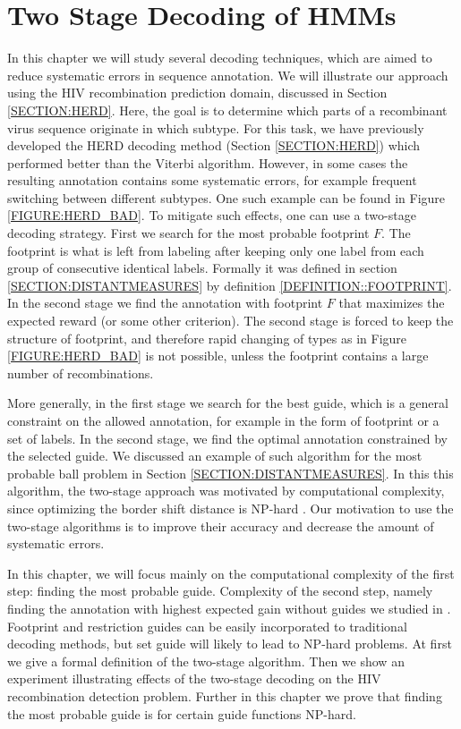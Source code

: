 \chapter{Two Stage Decoding of HMMs}\label{CHAPTER:TWOSTAGE}

In this chapter we will study several decoding techniques, which are aimed to
reduce systematic errors in sequence annotation.  We will illustrate our
approach using the HIV recombination prediction domain, discussed in Section
\ref{SECTION:HERD}. Here, the goal is to determine which parts of a recombinant
virus sequence originate in which subtype.  For this task, we have previously
developed the HERD decoding method \cite{Nanasi2010, Nanasi2010mgr} (Section
\ref{SECTION:HERD}) which performed better than the Viterbi algorithm. However,
in some cases the resulting annotation contains some systematic errors, for
example frequent switching between different subtypes. One such example can be
found in Figure \ref{FIGURE:HERD_BAD}. To mitigate such effects, one can use a
two-stage decoding strategy. First we search for the most probable footprint
$F$. The footprint is what is left from labeling after keeping only one label from each group of consecutive
identical labels. Formally it was defined in section
\ref{SECTION:DISTANTMEASURES} by definition \ref{DEFINITION::FOOTPRINT}. In the
second stage we find the annotation with footprint $F$ that maximizes the
expected reward (or some other criterion). The second stage is forced to keep the
structure of footprint, and therefore rapid changing of types as in Figure
\ref{FIGURE:HERD_BAD} is not possible, unless the footprint contains a large
number of recombinations. 

More generally, in the first stage we search for the best guide, which is a
general constraint on the allowed annotation, for example in the form of
footprint or a set of labels. In the second stage, we find the optimal annotation
constrained by the selected guide. We discussed an example of such algorithm for the most probable ball
problem \cite{Brown2010, Truszkowski2011} in Section
\ref{SECTION:DISTANTMEASURES}. In this this algorithm, the two-stage approach was motivated
by computational complexity, since optimizing the border shift distance is
NP-hard \cite{Brown2010}. Our motivation to use the two-stage algorithms is to
improve their accuracy and decrease the amount of systematic errors. 

In this chapter, we will focus mainly on the computational complexity of the first step:
finding the most probable guide. Complexity of the second step, namely finding
the annotation with highest expected gain without guides we studied in
\cite{Nanasi2010, Nanasi2010mgr}. Footprint and restriction guides can be easily incorporated to traditional decoding methods, but set guide will likely to lead to NP-hard problems. At first we give a formal definition of the
two-stage algorithm. Then we show an experiment illustrating effects of the
two-stage decoding on the HIV recombination detection problem. Further in this
chapter we prove that finding the most probable guide is for certain guide
functions NP-hard.


